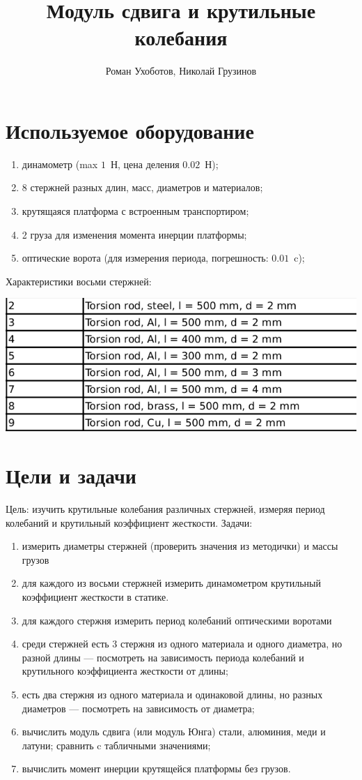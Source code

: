\documentclass[a4paper, 12pt]{article}
\title{Модуль сдвига и крутильные колебания}
\author{Роман Ухоботов, Николай Грузинов}
\date{}%
\begin{document}
\maketitle

\section{Используемое оборудование}
\begin{enumerate}
\item динамометр (max $1$~Н, цена деления $0.02$~Н);
\item 8 стержней разных длин, масс, диаметров и материалов;
\item крутящаяся платформа с встроенным транспортиром;
\item 2 груза для изменения момента инерции платформы;
\item оптические ворота (для измерения периода, погрешность: $0.01$~c);
\end{enumerate}
Характеристики восьми стержней:
\begin{center}
\includegraphics[width=0.7\linewidth]{rods_specification_list.png}
\end{center}

\section{Цели и задачи}
Цель: изучить крутильные колебания различных стержней, измеряя период колебаний и крутильный коэффициент жесткости.
Задачи:
\begin{enumerate}
\item измерить диаметры стержней (проверить значения из методички) и массы грузов
\item для каждого из восьми стержней измерить динамометром крутильный коэффициент жесткости в статике.
\item для каждого стержня измерить период колебаний оптическими воротами
\item среди стержней есть 3 стержня из одного материала и одного диаметра, но разной длины --- посмотреть на зависимость периода колебаний и крутильного коэффициента жесткости от длины;
\item есть два стержня из одного материала и одинаковой длины, но разных диаметров --- посмотреть на зависимость от диаметра;
\item вычислить модуль сдвига (или модуль Юнга) стали, алюминия, меди и латуни; сравнить c табличными значениями;
\item вычислить момент инерции крутящейся платформы без грузов.
\end{enumerate}
\end{document}
